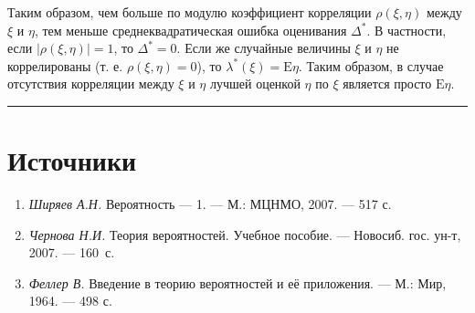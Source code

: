 \documentclass[11pt,a4paper]{article}
\providecommand{\tightlist}{%
      \setlength{\itemsep}{0pt}\setlength{\parskip}{0pt}}
\begin{document}
Таким образом, чем больше по модулю коэффициент корреляции
\(\rho(\xi, \eta)\) между \(\xi\) и \(\eta\), тем меньше
среднеквадратическая ошибка оценивания \(\Delta^\ast\). В частности,
если \(|\rho(\xi, \eta)|=1\), то \(\Delta^\ast = 0\). Если же случайные
величины \(\xi\) и \(\eta\) не коррелированы (т. е.
\(\rho(\xi, \eta)=0\)), то \(\lambda^\ast(\xi) = \mathrm{E}\eta\). Таким
образом, в случае отсутствия корреляции между \(\xi\) и \(\eta\) лучшей
оценкой \(\eta\) по \(\xi\) является просто \(\mathrm{E}\eta\).

    \begin{center}\rule{0.5\linewidth}{0.5pt}\end{center}

    \hypertarget{ux438ux441ux442ux43eux447ux43dux438ux43aux438}{%
\section{Источники}\label{ux438ux441ux442ux43eux447ux43dux438ux43aux438}}

\begin{enumerate}
\def\labelenumi{\arabic{enumi}.}
\tightlist
\item
  \emph{Ширяев А.Н.} Вероятность --- 1. --- М.: МЦНМО, 2007. --- 517 с.
\item
  \emph{Чернова Н.И.} Теория вероятностей. Учебное пособие. ---
  Новосиб. гос. ун-т, 2007. --- 160~с.
\item
  \emph{Феллер В.} Введение в теорию вероятностей и её приложения. ---
  М.: Мир, 1964. --- 498 с.
\end{enumerate}


\end{document}
